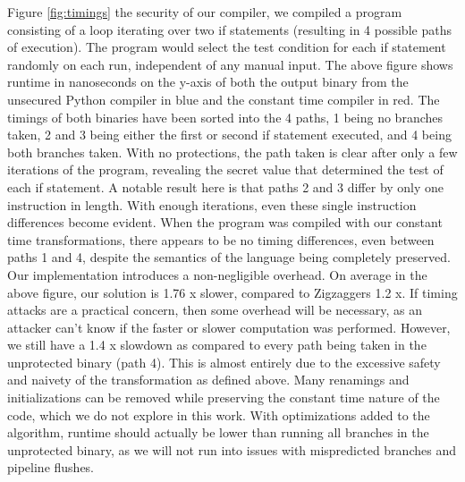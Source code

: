 \documentclass[sigplan, review]{acmart}
\begin{document}
Figure \ref{fig:timings} the security of our compiler, we compiled a program consisting of a loop iterating over two if statements (resulting in 4 possible paths of execution). The program would select the test condition for each if statement randomly on each run, independent of any manual input. The above figure shows runtime in nanoseconds on the y-axis of both the output binary from the unsecured Python compiler in blue and the constant time compiler in red. The timings of both binaries have been sorted into the 4 paths, 1 being no branches taken, 2 and 3 being either the first or second if statement executed, and 4 being both branches taken. With no protections, the path taken is clear after only a few iterations of the program, revealing the secret value that determined the test of each if statement. A notable result here is that paths 2 and 3 differ by only one instruction in length. With enough iterations, even these single instruction differences become evident. When the program was compiled with our constant time transformations, there appears to be no timing differences, even between paths 1 and 4, despite the semantics of the language being completely preserved.\\
Our implementation introduces a non-negligible overhead. On average in the above figure, our solution is 1.76 x slower, compared to Zigzaggers 1.2 x. If timing attacks are a practical concern, then some overhead will be necessary, as an attacker can’t know if the faster or slower computation was performed. However, we still have a 1.4 x slowdown as compared to every path being taken in the unprotected binary (path 4). This is almost entirely due to the excessive safety and naivety of the transformation as defined above. Many renamings and initializations can be removed while preserving the constant time nature of the code, which we do not explore in this work. With optimizations added to the algorithm, runtime should actually be lower than running all branches in the unprotected binary, as we will not run into issues with mispredicted branches and pipeline flushes.
\end{document}
